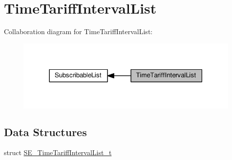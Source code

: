 \hypertarget{group__TimeTariffIntervalList}{}\section{Time\+Tariff\+Interval\+List}
\label{group__TimeTariffIntervalList}
Collaboration diagram for Time\+Tariff\+Interval\+List\+:\nopagebreak
\begin{figure}[H]
\begin{center}
\leavevmode
\includegraphics[width=314pt]{group__TimeTariffIntervalList}
\end{center}
\end{figure}
\subsection*{Data Structures}
\begin{DoxyCompactItemize}
\item 
struct \hyperlink{structSE__TimeTariffIntervalList__t}{S\+E\+\_\+\+Time\+Tariff\+Interval\+List\+\_\+t}
\end{DoxyCompactItemize}
